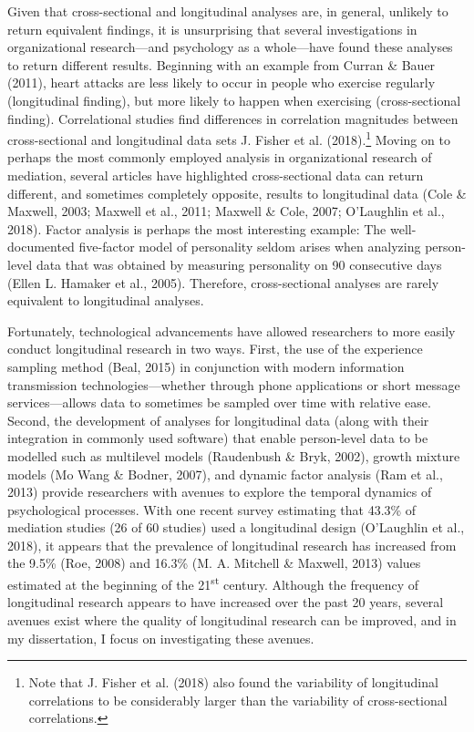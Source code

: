 \documentclass[
12pt, %
twoside,
english]{guelphthesis}
\theoremstyle{definition}
\theoremstyle{definition}
\theoremstyle{definition}
\theoremstyle{definition}
\theoremstyle{remark}
\begin{document}
Given that cross-sectional and longitudinal analyses are, in general, unlikely to return equivalent findings, it is unsurprising that several investigations in organizational research---and psychology as a whole---have found these analyses to return different results. Beginning with an example from Curran \& Bauer (2011), heart attacks are less likely to occur in people who exercise regularly (longitudinal finding), but more likely to happen when exercising (cross-sectional finding). Correlational studies find differences in correlation magnitudes between cross-sectional and longitudinal data sets J. Fisher et al. (2018).\footnote{Note that J. Fisher et al. (2018) also found the variability of longitudinal correlations to be considerably larger than the variability of cross-sectional correlations.} Moving on to perhaps the most commonly employed analysis in organizational research of mediation, several articles have highlighted cross-sectional data can return different, and sometimes completely opposite, results to longitudinal data (Cole \& Maxwell, 2003; Maxwell et al., 2011; Maxwell \& Cole, 2007; O'Laughlin et al., 2018). Factor analysis is perhaps the most interesting example: The well-documented five-factor model of personality seldom arises when analyzing person-level data that was obtained by measuring personality on 90 consecutive days (Ellen L. Hamaker et al., 2005). Therefore, cross-sectional analyses are rarely equivalent to longitudinal analyses.

Fortunately, technological advancements have allowed researchers to more easily conduct longitudinal research in two ways. First, the use of the experience sampling method (Beal, 2015) in conjunction with modern information transmission technologies---whether through phone applications or short message services---allows data to sometimes be sampled over time with relative ease. Second, the development of analyses for longitudinal data (along with their integration in commonly used software) that enable person-level data to be modelled such as multilevel models (Raudenbush \& Bryk, 2002), growth mixture models (Mo Wang \& Bodner, 2007), and dynamic factor analysis (Ram et al., 2013) provide researchers with avenues to explore the temporal dynamics of psychological processes. With one recent survey estimating that 43.3\% of mediation studies (26 of 60 studies) used a longitudinal design (O'Laughlin et al., 2018), it appears that the prevalence of longitudinal research has increased from the 9.5\% (Roe, 2008) and 16.3\% (M. A. Mitchell \& Maxwell, 2013) values estimated at the beginning of the 21\textsuperscript{st} century. Although the frequency of longitudinal research appears to have increased over the past 20 years, several avenues exist where the quality of longitudinal research can be improved, and in my dissertation, I focus on investigating these avenues.
\end{document}
